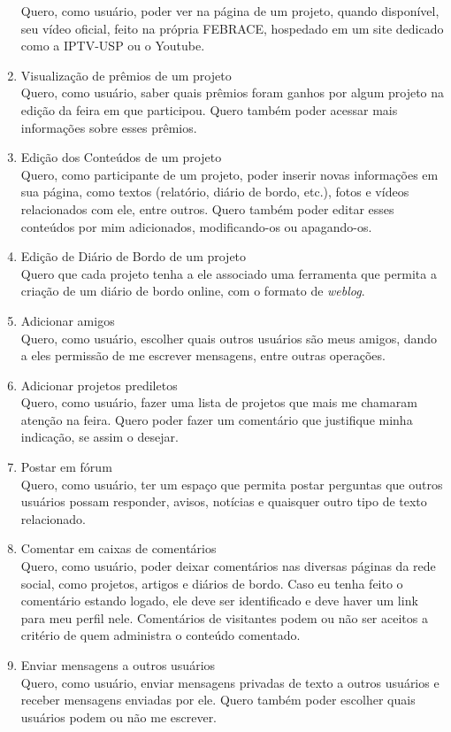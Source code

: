 \documentclass[a4paper,12pt,font=plain,header=plain]{abnt}
\begin{document}
\begin{enumerate}
		Quero, como usuário, poder ver na página de um projeto, quando disponível, seu vídeo oficial, feito na própria FEBRACE, hospedado em um site dedicado como a IPTV-USP ou o Youtube.
	 \item Visualização de prêmios de um projeto \\
		Quero, como usuário, saber quais prêmios foram ganhos por algum projeto na edição da feira em que participou. Quero também poder acessar mais informações sobre esses prêmios.
	 \item Edição dos Conteúdos de um projeto \\
		Quero, como participante de um projeto, poder inserir novas informações em sua página, como textos (relatório, diário de bordo, etc.), fotos e vídeos relacionados com ele, entre outros. Quero também poder editar esses conteúdos por mim adicionados, modificando-os ou apagando-os.
	 \item Edição de Diário de Bordo de um projeto \\
		Quero que cada projeto tenha a ele associado uma ferramenta que permita a criação de um diário de bordo online, com o formato de \textit{weblog}.
	 \item Adicionar amigos \\
		Quero, como usuário, escolher quais outros usuários são meus amigos, dando a eles permissão de me escrever mensagens, entre outras operações.
	 \item Adicionar projetos prediletos \\
		Quero, como usuário, fazer uma lista de projetos que mais me chamaram atenção na feira. Quero poder fazer um comentário que justifique minha indicação, se assim o desejar.
	 \item Postar em fórum \\
		Quero, como usuário, ter um espaço que permita postar perguntas que outros usuários possam responder, avisos, notícias e quaisquer outro tipo de texto relacionado.
	 \item Comentar em caixas de comentários \\
		Quero, como usuário, poder deixar comentários nas diversas páginas da rede social, como projetos, artigos e diários de bordo. Caso eu tenha feito o comentário estando logado, ele deve ser identificado e deve haver um link para meu perfil nele. Comentários de visitantes podem ou não ser aceitos a critério de quem administra o conteúdo comentado.
	 \item Enviar mensagens a outros usuários \\
		Quero, como usuário, enviar mensagens privadas de texto a outros usuários e receber mensagens enviadas por ele. Quero também poder escolher quais usuários podem ou não me escrever.

\end{enumerate}
\end{document}
